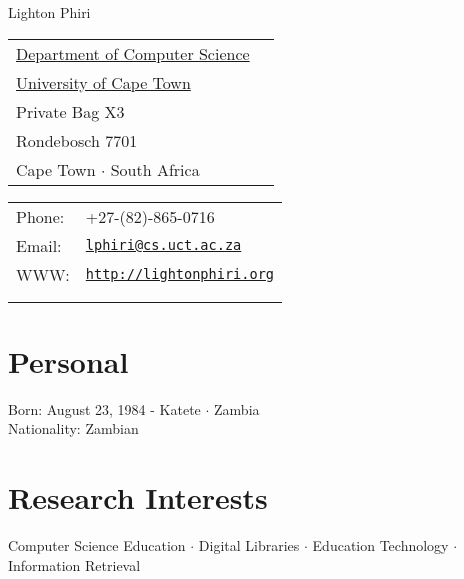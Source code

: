 \documentclass[letterpaper]{article}
\def\name{Lighton Phiri}
\renewenvironment{itemize}{
  \begin{list}{}{
    \setlength{\leftmargin}{1.5em}
  }
}{
  \end{list}
}
\begin{document}
{\huge \name}


\vspace{0.25in}

\begin{minipage}{0.45\linewidth}
\begin{tabular}{ll}
    \href{http://wwww.cs.uct.ac.za}{Department of Computer Science} \\
    \href{http://www.uct.ac.za}{University of Cape Town} \\
    Private Bag X3 \\
    Rondebosch 7701 \\
    Cape Town $\cdot$ South Africa 
\end{tabular}
\end{minipage}
\begin{minipage}{0.45\linewidth}
  \begin{tabular}{ll}
    Phone: & +27-(82)-865-0716 \\
    Email: & \href{mailto:lphiri@cs.uct.ac.za}{\tt lphiri@cs.uct.ac.za} \\
    WWW: & \href{http://lightonphiri.org}{\tt http://lightonphiri.org} \\
    \linebreak\\
    \linebreak\\
  \end{tabular}
\end{minipage}


\section*{Personal}

\begin{itemize}
\item Born: August 23, 1984 - Katete $\cdot$ Zambia\\
Nationality: Zambian
\end{itemize}

\section*{Research Interests}

\begin{itemize}
\item Computer Science Education $\cdot$ Digital Libraries $\cdot$ Education Technology $\cdot$ Information Retrieval
\end{itemize}
\end{document}
